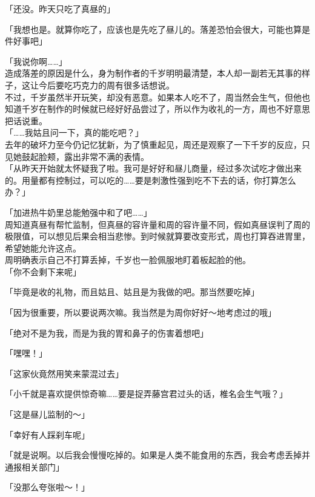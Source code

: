 「还没。昨天只吃了真昼的」

「我想也是。就算你吃了，应该也是先吃了昼儿的。落差恐怕会很大，可能也算是件好事吧」

「我说你啊……」\\

造成落差的原因是什么，身为制作者的千岁明明最清楚，本人却一副若无其事的样子，这让今后要吃巧克力的周有很多话想说。\\

不过，千岁虽然半开玩笑，却没有恶意。如果本人吃不了，周当然会生气，但他也知道千岁在制作的时候就已经好好品尝过了，所以作为收礼的一方，周也不好意思把话说重。\\

「……我姑且问一下，真的能吃吧？」\\

去年的破坏力至今仍记忆犹新，为了慎重起见，周还是观察了一下千岁的反应，只见她鼓起脸颊，露出非常不满的表情。\\

「从昨天开始就太怀疑我了啦。我可是好好和昼儿商量，经过多次试吃才做出来的。用量都有控制过，可以吃的……要是刺激性强到吃不下去的话，你打算怎么办？」

「加进热牛奶里总能勉强中和了吧……」\\

周知道真昼有帮忙监制，但真昼的容许量和周的容许量不同，假如真昼误判了周的极限值，可以想见后果会相当悲惨。到时候就算要改变形式，周也打算吞进胃里，希望她能允许这点。\\

周明确表示自己不打算丢掉，千岁也一脸佩服地盯着板起脸的他。\\

「你不会剩下来呢」

「毕竟是收的礼物，而且姑且、姑且是为我做的吧。那当然要吃掉」

「因为很重要，所以要说两次嘛。我当然是为周你好好～地考虑过的哦」

「绝对不是为我，而是为我的胃和鼻子的伤害着想吧」

「嘿嘿！」

「这家伙竟然用笑来蒙混过去」

「小千就是喜欢提供惊奇嘛……要是捉弄藤宫君过头的话，椎名会生气哦？」

「这是昼儿监制的～」

「幸好有人踩刹车呢」

「就是说啊。以后我会慢慢吃掉的。如果是人类不能食用的东西，我会考虑丢掉并通报相关部门」

「没那么夸张啦～！」


